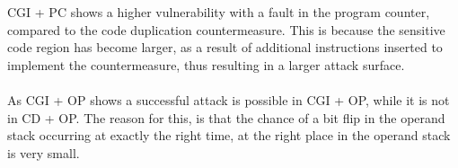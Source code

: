 CGI + PC shows a higher vulnerability with a fault in the program counter, compared to the code duplication countermeasure. This is because the sensitive code region has become larger, as a result of additional instructions inserted to implement the countermeasure, thus resulting in a larger attack surface.\\\\
As CGI + OP shows a successful attack is possible in CGI + OP, while it is not in CD + OP. The reason for this, is that the chance of a bit flip in the operand stack occurring at exactly the right time, at the right place in the operand stack is very small.

